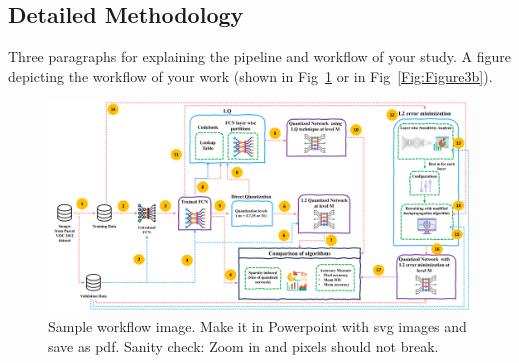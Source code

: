 \documentclass[conference]{IEEEtran}
\begin{document}
\subsection{Detailed Methodology}
Three paragraphs for explaining the pipeline and workflow of your study.
A figure depicting the workflow of your work (shown in Fig~\ref{Fig:Figure1} or in Fig~\ref{Fig:Figure3b}).

\begin{figure}[htbp]
\centerline{\includegraphics[width=17.8cm]{Figure1.pdf}}
\caption{Sample workflow image. Make it in Powerpoint with svg images and save as pdf. Sanity check: Zoom in and pixels should not break.}
\label{Fig:Figure1}
\end{figure}
\end{document}
